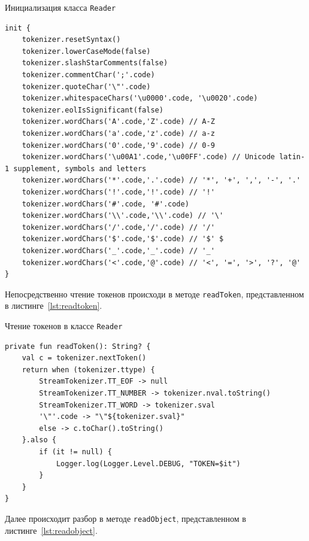 \documentclass[14pt, russian]{scrartcl}
\begin{document}
\begin{listing}[!htb]
\caption{Инициализация класса \texttt{Reader}}
\label{lst:readerinit}
\begin{verbatim}
init {
    tokenizer.resetSyntax()
    tokenizer.lowerCaseMode(false)
    tokenizer.slashStarComments(false)
    tokenizer.commentChar(';'.code)
    tokenizer.quoteChar('\"'.code)
    tokenizer.whitespaceChars('\u0000'.code, '\u0020'.code)
    tokenizer.eolIsSignificant(false)
    tokenizer.wordChars('A'.code,'Z'.code) // A-Z
    tokenizer.wordChars('a'.code,'z'.code) // a-z
    tokenizer.wordChars('0'.code,'9'.code) // 0-9
    tokenizer.wordChars('\u00A1'.code,'\u00FF'.code) // Unicode latin-1 supplement, symbols and letters
    tokenizer.wordChars('*'.code,'.'.code) // '*', '+', ',', '-', '.'
    tokenizer.wordChars('!'.code,'!'.code) // '!'
    tokenizer.wordChars('#'.code, '#'.code)
    tokenizer.wordChars('\\'.code,'\\'.code) // '\'
    tokenizer.wordChars('/'.code,'/'.code) // '/'
    tokenizer.wordChars('$'.code,'$'.code) // '$' $
    tokenizer.wordChars('_'.code,'_'.code) // '_'
    tokenizer.wordChars('<'.code,'@'.code) // '<', '=', '>', '?', '@'
}
\end{verbatim}
\end{listing}

Непосредственно чтение токенов происходи в методе \texttt{readToken}, представленном в листинге~\ref{lst:readtoken}.

\begin{listing}[!htb]
\caption{Чтение токенов в классе \texttt{Reader}}
\label{lst:readtoken}
\begin{verbatim}
private fun readToken(): String? {
    val c = tokenizer.nextToken()
    return when (tokenizer.ttype) {
        StreamTokenizer.TT_EOF -> null
        StreamTokenizer.TT_NUMBER -> tokenizer.nval.toString()
        StreamTokenizer.TT_WORD -> tokenizer.sval
        '\"'.code -> "\"${tokenizer.sval}"
        else -> c.toChar().toString()
    }.also {
        if (it != null) {
            Logger.log(Logger.Level.DEBUG, "TOKEN=$it")
        }
    }
}
\end{verbatim}
\end{listing}

Далее происходит разбор в методе \texttt{readObject}, представленном в листинге~\ref{lst:readobject}.
\end{document}
